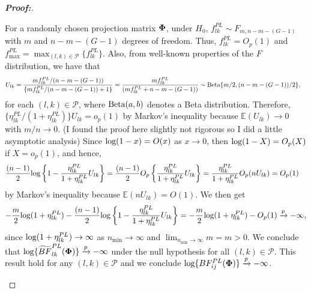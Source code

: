 \documentclass[times,sort&compress,3p]{elsarticle}
\theoremstyle{plain}%
\theoremstyle{definition}
\def\log{\hbox{log}}
\def\Beta{\hbox{Beta}}
\def\log{\hbox{log}}
\def\Beta{\hbox{Beta}}
\def\bse{\begin{eqnarray*}}
\def\ese{\end{eqnarray*}}
\newcommand{\uPhi}              {\mbox{\boldmath$\Phi$}}
\newcommand{\rsz}[1]{\textcolor{red}{#1}}
\begin{document}
\begin{proof}[\textbf{\upshape Proof:}]
\begin{description}
For a randomly chosen projection matrix $\uPhi$, under $H_{0}$, $f^{PL}_{lk}  \sim F_{m, n-m-(G-1)}$ with $m$ and $n - m -(G-1)$ degrees of freedom.
Thus, $f^{PL}_{lk} = O_{p}(1)$ and $f^{PL}_{\max} = \max_{(l,k) \in \mathcal{P}}\{ f_{lk}^{PL}\}$.
Also, from well-known properties of the $F$ distribution, we have that
\begin{align*}
U_{lk} & = \frac{m f_{lk}^{PL}/(n-m-(G-1) )}{\{m f_{lk}^{PL}/(n-m- (G-1) ) + 1\}} 
  =\frac{m f_{lk}^{PL}}{( m f_{lk}^{PL} +n-m- (G-1))} \sim \Beta\{m/2, (n-m-(G-1))/2 \},
\end{align*}
for each {$(l, k)\in\mathcal{P}$}, where $\Beta(a, b)$ denotes a Beta distribution.
Therefore, $\{\eta^{PL}_{lk}/(1 + \eta^{PL}_{lk})\} U_{lk} = o_{p}(1)$ by Markov's inequality because $\mathbb{E}(U_{lk}) \to 0$ with $m/n\to 0$.
(I found the proof here slightly not rigorous so I did a little asymptotic analysis) Since $\log(1 - x) = O(x)$ as $x\to 0$, then $\log(1 - X) = O_p(X)$ if $X = o_p(1)$, and hence,
\begin{align*}
    \frac{(n - 1)}{2}\log\left\{1 - \frac{\eta_{lk}^{PL}}{1 + \eta_{lk}^{PL}}U_{lk}\right\}
    & = \frac{(n - 1)}{2}O_p\left\{\frac{\eta_{lk}^{PL}}{1 + \eta_{lk}^{PL}}U_{lk}\right\} = \frac{\eta_{lk}^{PL}}{1 + \eta_{lk}^{PL}}O_p(nU_{lk}) = O_p(1)
\end{align*}
by Markov's inequality because $\mathbb{E}(nU_{lk}) = O(1)$. 
We then get
\bse
-\frac{m}{2}\log(1 + \eta^{PL}_{lk}) -\frac{(n-1)}{2}\log\left\{1 - \frac{\eta_{lk}^{PL}}{1 + \eta_{lk}^{PL}}U_{lk}\right\}
= -\frac{m}{2}\log(1 + \eta^{PL}_{lk}) - O_p(1) \xrightarrow[]{p} -\infty,
\ese
since $\log(1 + \eta^{PL}_{lk}) \rightarrow \infty$ as $n_{\min} \rightarrow \infty$ and $\lim_{n_{\min} \rightarrow \infty} m = m > 0$.
We conclude that $\log\{\widetilde{BF}^{PL}_{lk}(\uPhi)\} \xrightarrow[]{p} -\infty$ under the null hypothesis for all $(l, k)\in\mathcal{P}$.
This result hold for any $(l,k) \in \mathcal{P}$ and we conclude $\log\{BF^{PL}_{ij}(\uPhi)\} \xrightarrow[]{p} -\infty$. 


\end{description}
\end{proof}
\end{document}
